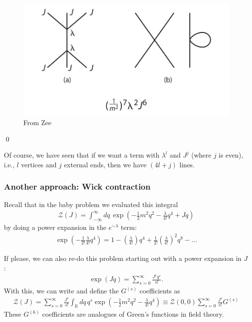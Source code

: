 \documentclass{book}
\theoremstyle{definition}
\newcommand{\f}[2]{\frac{#1}{#2}}
\newcommand{\lp}{\left(}
\newcommand{\rp}{\right)}
\newcommand{\Z}{\mathcal{Z}}
\begin{document}
\begin{figure}[!htb]
	\centering
	\includegraphics[scale=0.4]{feynman-diagram-3}
	\caption{From Zee}
\end{figure} \qed

Of course, we have seen that if we want a term with $\lambda^l$ and $J^j$ (where $j$ is even), i.e., $l$ vertices and $j$ external ends, then we have $(4l + j)$ lines.







\subsubsection{Another approach: Wick contraction}

Recall that in the baby problem we evaluated this integral
\begin{align}
\Z(J) = \int^\infty_{-\infty} dq\, \exp\lp -\f{1}{2}m^2 q^2 - \f{\lambda}{4!}q^4 + Jq \rp
\end{align}
by doing a power expansion in the $e^{\sim \lambda}$ term:
\begin{align}
\exp\lp -\f{1}{2!}\f{\lambda}{4!}q^4 \rp = 1 - \lp\f{\lambda}{4!}\rp q^4 + \f{1}{2!}\lp\f{\lambda}{4!}\rp^2 q^8 - \dots
\end{align}


If please, we can also re-do this problem starting out with a power expansion in $J$:
\begin{align}
\exp\lp Jq \rp = \sum^\infty_{s=0} \f{J^s q^s}{s!}.
\end{align}
With this, we can write and define the $G^{(s)}$ coefficients as
\begin{align}
\boxed{\Z(J) = \sum^\infty_{s=0} \f{J^s}{s!}\int_\mathbb{R}dq\, q^s \exp\lp -\f{1}{2}m^2 q^2 - \f{\lambda}{4!}q^4 \rp \equiv \Z(0,0) \sum^\infty_{s=0} \f{J^s}{s!} G^{(s)} }
\end{align}
These $G^{(6)}$ coefficients are analogues of Green's functions in field theory. \\
\end{document}
